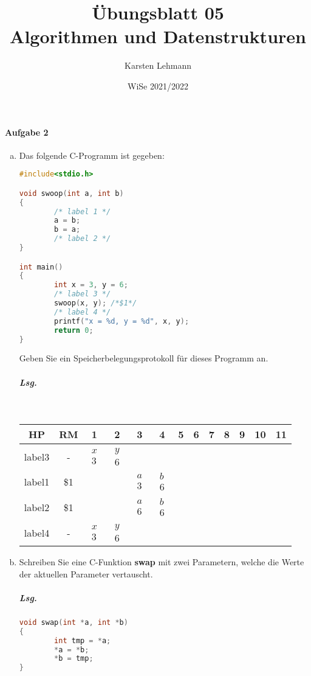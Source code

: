 \documentclass{scrreprt}
\author{Karsten Lehmann}
\date{WiSe 2021/2022}
\title{Übungsblatt 05\\Algorithmen und Datenstrukturen}
\begin{document}
\paragraph{Aufgabe 2}
\begin{enumerate}[(a)]
\item Das folgende C-Programm ist gegeben:
  \begin{lstlisting}[language=C, showstringspaces=false]
#include<stdio.h>

void swoop(int a, int b)
{
        /* label 1 */
        a = b;
        b = a;
        /* label 2 */
}

int main()
{
        int x = 3, y = 6;
        /* label 3 */
        swoop(x, y); /*$1*/
        /* label 4 */
        printf("x = %d, y = %d", x, y);
        return 0;
}
  \end{lstlisting}
  Geben Sie ein Speicherbelegungsprotokoll für dieses Programm an.

  \subparagraph{Lsg.}\,\:

  \begin{tabular}{|c|c|c|c|c|c|c|c|c|c|c|c|c|}
    \hline
    HP & RM & 1 & 2 & 3 & 4 & 5 & 6 & 7 & 8 & 9 & 10 & 11 \\
    \hline
    label3 & - & $\substack{x \\ 3}$ & $\substack{y \\ 6}$ & & & & & & & & & \\
    \hline
    label1 & \$1 & & & $\substack{a \\ 3}$ & $\substack{b \\ 6}$ & & & & & & & \\
    \hline
    label2 & \$1 & & & $\substack{a \\ 6}$ & $\substack{b \\ 6}$ & & & & & & & \\
    \hline
    label4 & - & $\substack{x \\ 3}$ & $\substack{y \\ 6}$ & & & & & & & & & \\
    \hline
  \end{tabular}

\newpage
\item Schreiben Sie eine C-Funktion \textbf{swap} mit zwei Parametern, welche die
  Werte der aktuellen Parameter vertauscht.

  \subparagraph{Lsg.}
  \begin{lstlisting}[language=C, showstringspaces=false]
void swap(int *a, int *b)
{
        int tmp = *a;
        *a = *b;
        *b = tmp;
}
  \end{lstlisting}
\end{enumerate}
\end{document}
